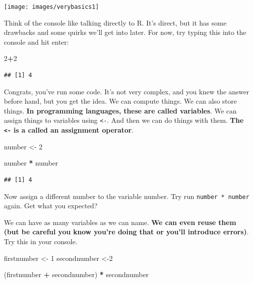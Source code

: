 \documentclass[
]{book}
\newenvironment{Shaded}{\begin{snugshade}}{\end{snugshade}}
\newcommand{\DecValTok}[1]{\textcolor[rgb]{0.00,0.00,0.81}{#1}}
\newcommand{\NormalTok}[1]{#1}
\newcommand{\OperatorTok}[1]{\textcolor[rgb]{0.81,0.36,0.00}{\textbf{#1}}}
\newcommand{\StringTok}[1]{\textcolor[rgb]{0.31,0.60,0.02}{#1}}
\begin{document}
\texttt{[image: images/verybasics1]}

Think of the console like talking directly to R. It's direct, but it has some drawbacks and some quirks we'll get into later. For now, try typing this into the console and hit enter:

\begin{Shaded}
\begin{Highlighting}[]
\DecValTok{2}\OperatorTok{+}\DecValTok{2}
\end{Highlighting}
\end{Shaded}

\begin{verbatim}
## [1] 4
\end{verbatim}

Congrats, you've run some code. It's not very complex, and you knew the answer before hand, but you get the idea. We can compute things. We can also store things. \textbf{In programming languages, these are called variables}. We can assign things to variables using \texttt{\textless{}-}. And then we can do things with them. \textbf{The \texttt{\textless{}-} is a called an assignment operator}.

\begin{Shaded}
\begin{Highlighting}[]
\NormalTok{number <-}\StringTok{ }\DecValTok{2}

\NormalTok{number }\OperatorTok{*}\StringTok{ }\NormalTok{number}
\end{Highlighting}
\end{Shaded}

\begin{verbatim}
## [1] 4
\end{verbatim}

Now assign a different number to the variable number. Try run \texttt{number\ *\ number} again. Get what you expected?

We can have as many variables as we can name. \textbf{We can even reuse them (but be careful you know you're doing that or you'll introduce errors)}. Try this in your console.

\begin{Shaded}
\begin{Highlighting}[]
\NormalTok{firstnumber <-}\StringTok{ }\DecValTok{1}
\NormalTok{secondnumber <-}\DecValTok{2} 

\NormalTok{(firstnumber }\OperatorTok{+}\StringTok{ }\NormalTok{secondnumber) }\OperatorTok{*}\StringTok{ }\NormalTok{secondnumber}
\end{Highlighting}
\end{Shaded}
\end{document}
